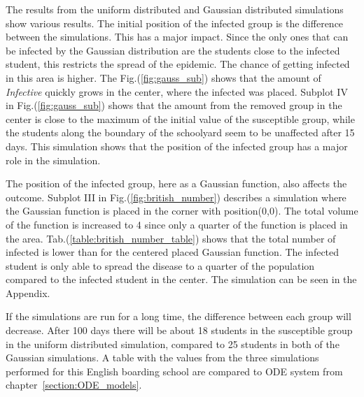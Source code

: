 \documentclass[%
twoside,                 %
final,                   %
chapterprefix=true,      %
open=right               %
10pt]{book}
\begin{document}
The results from the uniform distributed and Gaussian distributed simulations show various results. The initial position of the infected group is the difference between the simulations. This has a major impact. Since the only ones that can be infected by the Gaussian distribution are the students close to the infected student, this restricts the spread of the epidemic. The chance of getting infected in this area is higher. The Fig.(\ref{fig:gauss_sub}) shows that the amount of \emph{Infective} quickly grows in the center, where the infected was placed. Subplot IV in Fig.(\ref{fig:gauss_sub}) shows that the amount from the removed group in the center is close to the maximum of the initial value of  the susceptible group, while the students along the boundary of the schoolyard seem to be unaffected after 15 days. This simulation shows that the position of the infected group has a major role in the simulation.


\vspace{3mm}




\vspace{3mm}


The position of the infected group, here as a Gaussian function, also affects the outcome. Subplot III in Fig.(\ref{fig:british_number}) describes a simulation where the Gaussian function is placed in the corner with position(0,0). The total volume of the function is increased to 4 since only a quarter of the function is placed in the area. Tab.(\ref{table:british_number_table}) shows that the total number of infected is lower than for the centered placed Gaussian function. The infected student is only able to spread the disease to a quarter of the population compared to the infected student in the center. The simulation can be seen in the Appendix.


\vspace{3mm}




\vspace{3mm}


If the simulations are run for a long time, the difference between each group will decrease. After 100 days there will be about 18 students in the susceptible group in the uniform distributed simulation, compared to 25 students in both of the Gaussian simulations. A table with the values from the three simulations performed for this English boarding school are compared to ODE system from chapter~\ref{section:ODE_models}.

\label{table:british_number_table}
\end{document}
